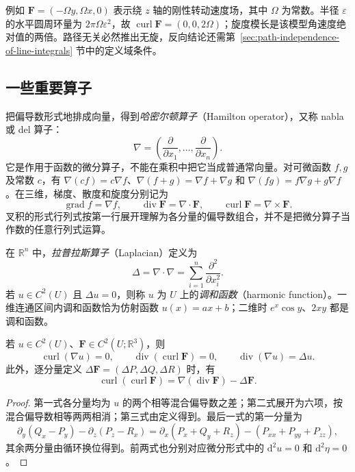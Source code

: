 例如 $\boldsymbol F=(-\Omega y,\Omega x,0)$ 表示绕 $z$ 轴的刚性转动速度场，其中 $\Omega$ 为常数。半径 $\varepsilon$ 的水平圆周环量为 $2\pi\Omega\varepsilon^2$，故 $\operatorname{curl}\boldsymbol F=(0,0,2\Omega)$；旋度模长是该模型角速度绝对值的两倍。路径无关必然推出无旋，反向结论还需第~\ref{sec:path-independence-of-line-integrals} 节中的定义域条件。

\subsection{一些重要算子}
\label{subsec:important-field-operators}

把偏导数形式地排成向量，得到\emph{哈密尔顿算子}（Hamilton operator），又称 nabla 或 del 算子：
\[
    \nabla=\left(\frac{\partial}{\partial x_1},\ldots,
    \frac{\partial}{\partial x_n}\right).
\]
它是作用于函数的微分算子，不能在乘积中把它当成普通常向量。对可微函数 $f,g$ 及常数 $c$，有 $\nabla(cf)=c\nabla f$、$\nabla(f+g)=\nabla f+\nabla g$ 和 $\nabla(fg)=f\nabla g+g\nabla f$。在三维，梯度、散度和旋度分别记为
\[
    \operatorname{grad}f=\nabla f,\qquad
    \operatorname{div}\boldsymbol F=\nabla\cdot\boldsymbol F,\qquad
    \operatorname{curl}\boldsymbol F=\nabla\times\boldsymbol F.
\]
叉积的形式行列式按第一行展开理解为各分量的偏导数组合，并不是把微分算子当作数的任意行列式运算。

\begin{definition}
\label{def:laplacian-and-harmonic-function}
在 $\mathbb R^n$ 中，\emph{拉普拉斯算子}（Laplacian）定义为
\begin{equation}
\label{eq:laplace-operator}
    \Delta=\nabla\cdot\nabla
    =\sum_{i=1}^n\frac{\partial^2}{\partial x_i^2}.
\end{equation}
若 $u\in C^2(U)$ 且 $\Delta u=0$，则称 $u$ 为 $U$ 上的\emph{调和函数}（harmonic function）。一维连通区间内调和函数恰为仿射函数 $u(x)=ax+b$；二维时 $e^x\cos y$、$2xy$ 都是调和函数。
\end{definition}

\begin{proposition}
\label{prop:basic-vector-calculus-identities}
若 $u\in C^2(U)$、$\boldsymbol F\in C^2(U;\mathbb R^3)$，则
\begin{equation}
\label{eq:vector-calculus-identities}
    \operatorname{curl}(\nabla u)=0,\qquad
    \operatorname{div}(\operatorname{curl}\boldsymbol F)=0,
    \qquad \operatorname{div}(\nabla u)=\Delta u.
\end{equation}
此外，逐分量定义 $\Delta\boldsymbol F=(\Delta P,\Delta Q,\Delta R)$ 时，有
\[
    \operatorname{curl}(\operatorname{curl}\boldsymbol F)
    =\nabla(\operatorname{div}\boldsymbol F)-\Delta\boldsymbol F.
\]
\end{proposition}
\begin{proof}
第一式各分量均为 $u$ 的两个相等混合偏导数之差；第二式展开为六项，按混合偏导数相等两两相消；第三式由定义得到。最后一式的第一分量为
\[
    \partial_y(Q_x-P_y)-\partial_z(P_z-R_x)
    =\partial_x(P_x+Q_y+R_z)-(P_{xx}+P_{yy}+P_{zz}),
\]
其余两分量由循环换位得到。前两式也分别对应微分形式中的 $\mathrm d^2u=0$ 和 $\mathrm d^2\eta=0$。
\end{proof}

